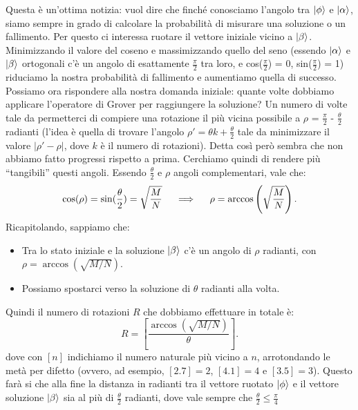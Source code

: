 \documentclass{book}
\theoremstyle{definition}
\theoremstyle{definition}
\theoremstyle{definition}
\theoremstyle{plain}
\theoremstyle{plain}
\theoremstyle{plain}
\theoremstyle{plain}
\begin{document}
Questa è un'ottima notizia: vuol dire che finché conosciamo l'angolo tra $\ket{\phi}$ e $\ket{\alpha}$, siamo sempre in grado di calcolare la probabilità di misurare una soluzione o un fallimento. Per questo ci interessa ruotare il vettore iniziale vicino a $\ket{\beta}$. Minimizzando il valore del coseno e massimizzando quello del seno (essendo $\ket{\alpha}$ e $\ket{\beta}$ ortogonali c'è un angolo di esattamente $\frac{\pi}{2}$ tra loro, e cos($\frac{\pi}{2}$) = 0, sin($\frac{\pi}{2}$) = 1) riduciamo la nostra probabilità di fallimento e aumentiamo quella di successo. \\
Possiamo ora rispondere alla nostra domanda iniziale: quante volte dobbiamo applicare l'operatore di Grover per raggiungere la soluzione? Un numero di volte tale da permetterci di compiere una rotazione il più vicina possibile a $\rho$ = $\frac{\pi}{2}$ - $\frac{\theta}{2}$ radianti %
(l'idea è quella di trovare l'angolo $\rho' = \theta k + \frac{\theta}{2}$ tale da minimizzare il valore $\left\lvert \rho' - \rho \right\rvert$, dove $k$ è il numero di rotazioni). Detta così però sembra che non abbiamo fatto progressi rispetto a prima. Cerchiamo quindi di rendere più ``tangibili'' questi angoli. Essendo $\frac{\theta}{2}$ e $\rho$ angoli complementari, vale che:
\begin{displaymath}
\cos(\rho) = \sin(\frac{\theta}{2}) = \sqrt{\frac{M}{N}} \mkern20mu \implies \mkern20mu \rho = \arccos\left(\sqrt{\frac{M}{N}}\right).
\end{displaymath}
Ricapitolando, sappiamo che:
\begin{itemize}
    \item Tra lo stato iniziale e la soluzione $\ket{\beta}$ c'è un angolo di $\rho$ radianti, con $\rho = \arccos(\sqrt{M/N})$.
    \item Possiamo spostarci verso la soluzione di $\theta$ radianti alla volta.
\end{itemize}
Quindi il numero di rotazioni $R$ che dobbiamo effettuare in totale è:
\begin{displaymath}
R = \left[ \frac{\arccos(\sqrt{M/N})}{\theta} \right].
\end{displaymath}
dove con $[n]$ indichiamo il numero naturale più vicino a $n$, arrotondando le metà per difetto (ovvero, ad esempio, $[2.7] = 2$, $[4.1] = 4$ e $[3.5] = 3$).
Questo farà si che alla fine la distanza in radianti tra il vettore ruotato $\ket{\phi}$ e il vettore soluzione $\ket{\beta}$ sia al più di $\frac{\theta}{2}$ radianti, dove vale sempre che $\frac{\theta}{2} \leq \frac{\pi}{4}$ %
\end{document}
